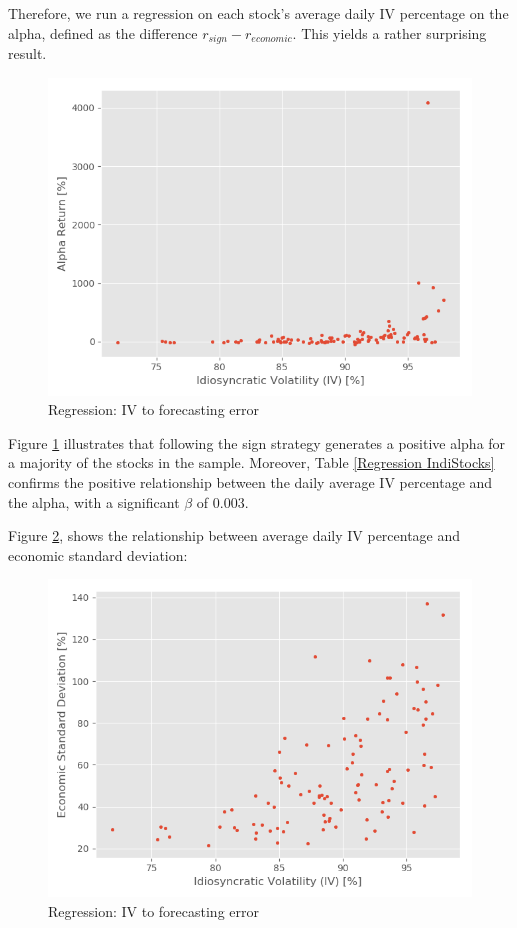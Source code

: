 Therefore, we run a regression on each stock’s average daily IV percentage on the alpha, defined as the difference $r_{sign}-r_{economic}$. This yields a rather surprising result.

\begin{figure}[h]
    \centering
    \includegraphics[scale = 0.5]{Plot/IndividualStockRegression2.png}
    \caption{Regression: IV to forecasting error}
    \label{IVAlphaRegression}
\end{figure}

\newpage

Figure \ref{IVAlphaRegression} illustrates that following the sign strategy generates a positive alpha for a majority of the stocks in the sample. Moreover, Table \ref{Regression IndiStocks} confirms the positive relationship between the daily average IV percentage and the alpha, with a significant $\beta$ of $0.003$. 

Figure \ref{IVtoVol}, shows the relationship between average daily IV percentage and economic standard deviation:

\begin{figure}[h]
    \centering
    \includegraphics[scale = 0.5]{Plot/IVvsEconomicVolatilityRegression.png}
    \caption{Regression: IV to forecasting error}
    \label{IVtoVol}
\end{figure}

